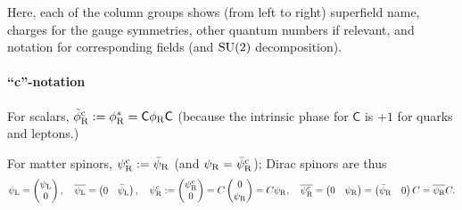 \documentclass[CheatSheet]{subfiles}
\begin{document}
 \noindent
Here, each of the column groups shows (from left to right) superfield name, charges for the gauge symmetries, other quantum numbers if relevant, and notation for corresponding fields (and $\operatorname{\mathrm SU}(2)$ decomposition).


\paragraph{``c''-notation}
For scalars, $\tilde\phi\w R^\cc:=\phi\w R^*={\mathsf C}\phi\w R{\mathsf C}$ (because the intrinsic phase for $\mathsf C$ is $+1$ for quarks and leptons.)

For matter spinors, $\psi\w R^\cc:=\bar\psi\w R$ (and $\psi\w R=\bar\psi\w R^\cc$); Dirac spinors are thus
\begin{equation*}
\displaystyle \psi\w L =\pmat{\psi\w L\\0},\quad
\displaystyle \overline{\psi\w L} = \pmat{0&\bar\psi\w L},\quad
 \psi\w R^\cc :=\pmat{\psi\w R^\cc \\ 0}=C\pmat{0\\\psi\w R} = C\psi\w R,
\quad
 \overline{\psi\w R^\cc} = \pmat{0 & \psi\w R} = \pmat{\bar\psi\w R & 0}C  = \overline{\psi\w R} C.
\end{equation*}
\end{document}
